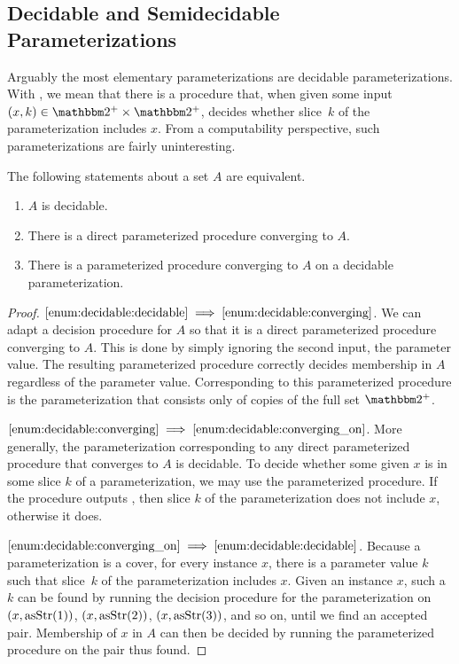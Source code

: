 \subsection{Decidable and Semidecidable Parameterizations}
\label{sec:computability:decidable}%
Arguably the most elementary parameterizations are decidable parameterizations.
With , we mean that there is a procedure that, when given some input $(x, k) \in \binary^+ \times \binary^+$, decides whether slice~$k$ of the parameterization includes $x$.
From a computability perspective, such parameterizations are fairly uninteresting.
\begin{theorem}
\label{thm:decidable}%
  The following statements about a set $A$ are equivalent.
  \begin{enumerate}[series=enum:decidable]
  \item\label{enum:decidable:decidable}
    $A$ is decidable.
  \item\label{enum:decidable:converging}
    There is a direct parameterized procedure converging to $A$.
  \item\label{enum:decidable:converging_on}
    There is a parameterized procedure converging to $A$ on a decidable parameterization.
  \end{enumerate}
\end{theorem}
\begin{proof}
$\ref{enum:decidable:decidable} \implies \ref{enum:decidable:converging}$.
  We can adapt a decision procedure for $A$ so that it is a direct parameterized procedure converging to $A$.
  This is done by simply ignoring the second input, the parameter value.
  The resulting parameterized procedure correctly decides membership in $A$ regardless of the parameter value.
  Corresponding to this parameterized procedure is the parameterization that consists only of copies of the full set $\binary^+$.

$\ref{enum:decidable:converging} \implies \ref{enum:decidable:converging_on}$.
  More generally, the parameterization corresponding to any direct parameterized procedure that converges to $A$ is decidable.
  To decide whether some given $x$ is in some slice $k$ of a parameterization, we may use the parameterized procedure.
  If the procedure outputs , then slice $k$ of the parameterization does not include $x$, otherwise it does.

$\ref{enum:decidable:converging_on} \implies \ref{enum:decidable:decidable}$.
  Because a parameterization is a cover, for every instance $x$, there is a parameter value $k$ such that slice~$k$ of the parameterization includes $x$.
  Given an instance $x$, such a $k$ can be found by running the decision procedure for the parameterization on $(x, \operatorname{asStr}(1))$, $(x, \operatorname{asStr}(2))$, $(x, \operatorname{asStr}(3))$, and so on, until we find an accepted pair.
  Membership of $x$ in $A$ can then be decided by running the parameterized procedure on the pair thus found.
\end{proof}

